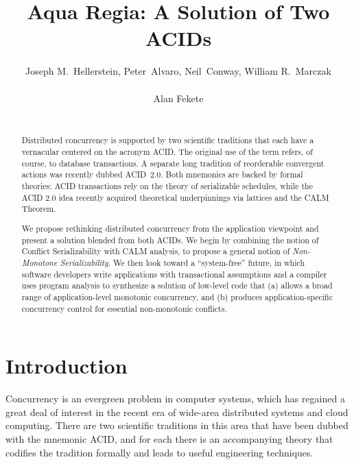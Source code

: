 \documentclass{sig-alternate}
\begin{document}

\title{Aqua Regia: A Solution of Two ACIDs}
\author{
\alignauthor
Joseph M.~Hellerstein, Peter~Alvaro, Neil~Conway, William R.~Marczak\\
       \\
\alignauthor
Alan Fekete\\
       \\
}

\maketitle
\begin{abstract}
  Distributed concurrency is supported by two scientific traditions that each
  have a vernacular centered on the acronym \textsf{ACID}.  The original use of
  the term refers, of course, to database transactions. A separate long
  tradition of reorderable convergent actions was recently dubbed
  \textsf{ACID~2.0}.  Both mnemonics are backed by formal theories:
  ACID transactions rely on the theory of serializable schedules, while the ACID
  2.0 idea recently acquired theoretical underpinnings via lattices and the CALM
  Theorem.

  We propose rethinking distributed concurrency from the application viewpoint
  and present a solution blended from both ACIDs.  We begin by combining the
  notion of Conflict Serializability with CALM analysis, to propose a general
  notion of \emph{Non-Monotone Serializability}.  We then look toward a
  ``system-free'' future, in which software developers write applications with
  transactional assumptions and a compiler uses program analysis to synthesize
  a solution of low-level code that (a) allows a broad range of
  application-level monotonic concurrency, and (b) produces application-specific
  concurrency control for essential non-monotonic conflicts.
\end{abstract}

\section{Introduction}
Concurrency is an evergreen problem in computer systems, which has regained a
great deal of interest in the recent era of wide-area distributed systems and
cloud computing.  There are two scientific traditions in this area that have
been dubbed with the mnemonic \textsf{ACID}, and for each there is an
accompanying theory that codifies the tradition formally and leads to useful
engineering techniques.
\end{document}
